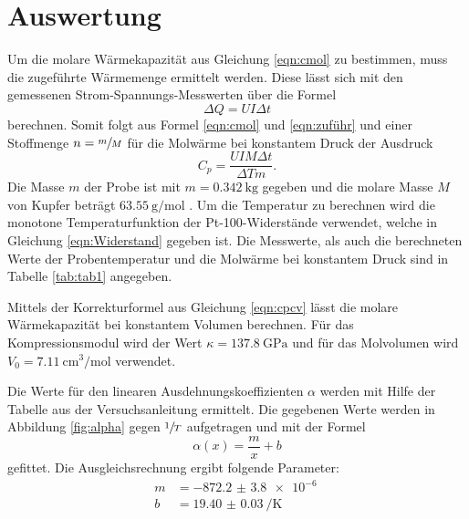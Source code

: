 \section{Auswertung}
\label{sec:Auswertung}
Um die molare Wärmekapazität aus Gleichung \ref{eqn:cmol} zu bestimmen, muss die zugeführte
Wärmemenge ermittelt werden. Diese lässt sich mit den gemessenen Strom-Spannungs-Messwerten über
die Formel
\begin{equation}
  \Delta Q = UI\Delta t
  \label{eqn:zuführ}
\end{equation}
berechnen.
Somit folgt aus Formel \ref{eqn:cmol} und \ref{eqn:zuführ} und einer Stoffmenge $n=\sfrac{m}{M}$
für die Molwärme bei konstantem Druck der Ausdruck
\begin{equation}
  C_p=\frac{UIM\Delta t}{\Delta T m}.
  \label{eqn:Cp}
\end{equation}
Die Masse $m$ der Probe ist mit $m=\SI{0.342}{\kg}$ gegeben und die molare Masse $M$ von
Kupfer beträgt $\SI{63.55}{\g\per\mol}$ \cite{kompress}.
Um die Temperatur zu berechnen wird die monotone Temperaturfunktion der
Pt-100-Widerstände verwendet, welche in Gleichung \ref{eqn:Widerstand}
gegeben ist. %
Die Messwerte, als auch die berechneten Werte der Probentemperatur und die
Molwärme bei konstantem Druck sind in Tabelle \ref{tab:tab1} angegeben.


Mittels der Korrekturformel aus Gleichung \ref{eqn:cpcv}
lässt die molare Wärmekapazität bei konstantem Volumen berechnen.
Für das Kompressionsmodul wird der Wert $\kappa=\SI{137.8}{\giga\Pa}$ \cite{kompress}
und für das Molvolumen wird $V_0=\SI{7.11}{\cm^3\per\mol}$
\cite{mol} verwendet.

Die Werte für den linearen Ausdehnungskoeffizienten $\alpha$
werden mit Hilfe der Tabelle aus der Versuchsanleitung \cite{skript} ermittelt.
Die gegebenen Werte werden in Abbildung \ref{fig:alpha} gegen $\sfrac{1}{T}$
aufgetragen und mit der Formel
\begin{equation}
  \alpha(x)= \frac{m}{x}+b
\end{equation}
gefittet. Die Ausgleichsrechnung ergibt folgende Parameter:
\begin{align}
  m &= \SI{-872.2(38)e-6}{}\\
  b &= \SI{19.40(3)}{\per\K}
\end{align}

